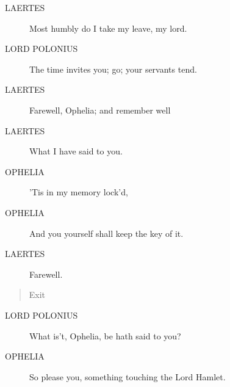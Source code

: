 \documentclass{article}
\begin{document}
\begin{description}
            
\item[LAERTES] Most humbly do I take my leave, my lord.
\end{description}
          
\begin{description}
            
\item[LORD POLONIUS] The time invites you; go; your servants tend.
\end{description}
          
\begin{description}
            
\item[LAERTES] Farewell, Ophelia; and remember well
\item[LAERTES] What I have said to you.
\end{description}
          
\begin{description}
            
\item[OPHELIA] 'Tis in my memory lock'd,
\item[OPHELIA] And you yourself shall keep the key of it.
\end{description}
          
\begin{description}
            
\item[LAERTES] Farewell.
\end{description}
          
\begin{quote}
Exit
\end{quote}
          
\begin{description}
            
\item[LORD POLONIUS] What is't, Ophelia, be hath said to you?
\end{description}
          
\begin{description}
            
\item[OPHELIA] So please you, something touching the Lord Hamlet.
\end{description}
          
\end{document}
